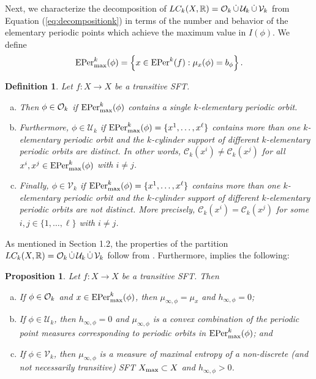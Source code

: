 \documentclass[11pt, reqno]{amsart}
\newtheorem{proposition}[theorem]{Proposition}
\newtheorem{definition}[theorem]{Definition}
\newcommand{\EPer}{{\rm EPer}}
\newcommand{\bR}{{\mathbb R}}
\newcommand{\cC}{{\mathcal C}}
\newcommand{\cU}{{\mathcal U}}
\newcommand{\cV}{{\mathcal V}}
\def\EPer{{\rm EPer}}
\begin{document}
Next, we characterize the decomposition of $LC_k(X,\bR)=\cO_k\,\dot\cup\,\cU_k\,\dot\cup\,\cV_k$ from Equation (\ref{eq:decompositionk}) in terms of the number and behavior of the elementary periodic points which achieve the maximum value in $I(\phi)$.  We define
$$
\EPer_{\rm max}^k(\phi)=\left\{x\in \EPer^k(f): \mu_x(\phi)=b_\phi\right\}.
$$
\begin{definition}
Let $f:X\to X$ be a transitive SFT.
\begin{enumerate}[(a)]
\item Then $\phi\in\mathcal O_k$ if $\EPer_{\rm max}^k(\phi)$ contains a single $k$-elementary periodic orbit. 
\item Furthermore, $\phi\in\cU_k$ if $\EPer_{\rm max}^k(\phi)=\{x^1,\dots,x^\ell\}$ contains more than one $k$-elementary periodic orbit and the $k$-cylinder support of different $k$-elementary periodic orbits are distinct.  In other words, $\cC_k(x^i)\not=\cC_k(x^j)$ for all $x^i,x^j\in \EPer_{\rm max}^k(\phi)$ with $i\not=j$.
\item Finally,  $\phi\in\cV_k$ if $\EPer_{\rm max}^k(\phi)=\{x^1,\dots,x^\ell\}$ contains more than one $k$-elementary periodic orbit and the $k$-cylinder support of different  $k$-elementary  periodic orbits are not distinct.  More precisely, $\cC_k(x^i)=\cC_k(x^j)$ for some $i,j\in\{1,\dots,\ell\}$ with $i\not=j$.
\end{enumerate}
\end{definition}
As mentioned in Section 1.2, the properties of the partition  $LC_k(X,\bR)=\cO_k\,\dot\cup\,\cU_k\,\dot\cup\,\cV_k$
follow from \cite{WY}. Furthermore, \cite{WY} implies  the following:
\begin{proposition}Let $f:X\to X$ be a transitive SFT.  Then
\begin{enumerate}[(a)]
\item If $\phi\in \mathcal O_k$ and $x\in\EPer_{\rm max}^k(\phi)$, then $\mu_{\infty,\phi}=\mu_x$ and $h_{\infty,\phi}=0$;
\item If $\phi\in \cU_k$, then $h_{\infty,\phi}=0$ and $\mu_{\infty,\phi}$ is a convex combination of the periodic point measures corresponding to periodic orbits in $\EPer_{\rm max}^k(\phi)$; and
\item If $\phi\in \cV_k$, then $\mu_{\infty,\phi}$ is a measure of maximal entropy of a non-discrete (and not necessarily transitive) SFT $X_{\rm max}\subset X$ and $h_{\infty,\phi}>0$.  
\end{enumerate}
\end{proposition}
\end{document}
